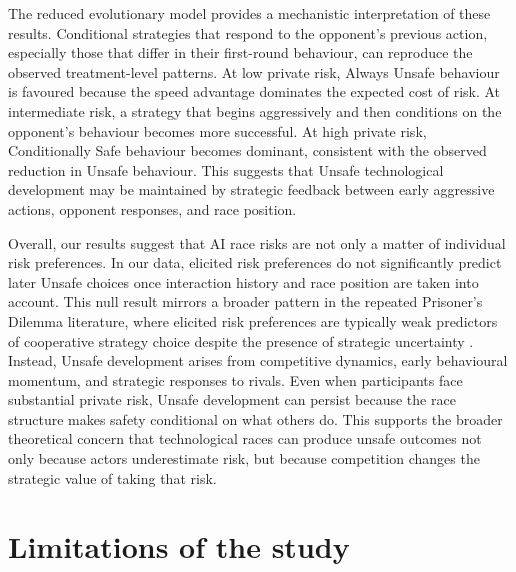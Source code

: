 \documentclass[pdflatex,sn-mathphys-ay]{sn-jnl}
\theoremstyle{thmstyleone}
\theoremstyle{thmstyletwo}
\theoremstyle{thmstylethree}
\begin{document}
The reduced evolutionary model provides a mechanistic interpretation of these results. Conditional strategies that respond to the opponent's previous action, especially those that differ in their first-round behaviour, can reproduce the observed treatment-level patterns. At low private risk, Always Unsafe behaviour is favoured because the speed advantage dominates the expected cost of risk. At intermediate risk, a strategy that begins aggressively and then conditions on the opponent's behaviour becomes more successful. At high private risk, Conditionally Safe behaviour becomes dominant, consistent with the observed reduction in Unsafe behaviour. This suggests that Unsafe technological development may be maintained by strategic feedback between early aggressive actions, opponent responses, and race position.

Overall, our results suggest that AI race risks are not only a matter of individual risk preferences. In our data, elicited risk preferences do not significantly predict later Unsafe choices once interaction history and race position are taken into account. This null result mirrors a broader pattern in the repeated Prisoner's Dilemma literature, where elicited risk preferences are typically weak predictors of cooperative strategy choice despite the presence of strategic uncertainty \citep{dal2018determinants}. Instead, Unsafe development arises from competitive dynamics, early behavioural momentum, and strategic responses to rivals. Even when participants face substantial private risk, Unsafe development can persist because the race structure makes safety conditional on what others do. This supports the broader theoretical concern that technological races can produce unsafe outcomes not only because actors underestimate risk, but because competition changes the strategic value of taking that risk.

\section{Limitations of the study}\label{sec:limitations}
\end{document}
